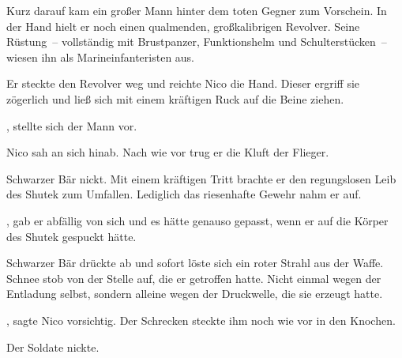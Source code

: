 \par

Kurz darauf kam ein großer Mann hinter dem toten Gegner zum Vorschein. In der Hand hielt er noch einen qualmenden, großkalibrigen Revolver. Seine Rüstung~-- vollständig mit Brustpanzer, Funktionshelm und Schulterstücken~-- wiesen ihn als Marineinfanteristen aus.

\par

Er steckte den Revolver weg und reichte Nico die Hand. Dieser ergriff sie zögerlich und ließ sich mit einem kräftigen Ruck auf die Beine ziehen.

\par

, stellte sich der Mann vor. 

\par

Nico sah an sich hinab. Nach wie vor trug er die Kluft der Flieger. 

\par

Schwarzer Bär nickt. Mit einem kräftigen Tritt brachte er den regungslosen Leib des Shutek zum Umfallen. Lediglich das riesenhafte Gewehr nahm er auf.

\par

, gab er abfällig von sich und es hätte genauso gepasst, wenn er auf die Körper des Shutek gespuckt hätte.

\par

Schwarzer Bär drückte ab und sofort löste sich ein roter Strahl aus der Waffe. Schnee stob von der Stelle auf, die er getroffen hatte. Nicht einmal wegen der Entladung selbst, sondern alleine wegen der Druckwelle, die sie erzeugt hatte.

\par

, sagte Nico vorsichtig. Der Schrecken steckte ihm noch wie vor in den Knochen.

\par

Der Soldate nickte. 

